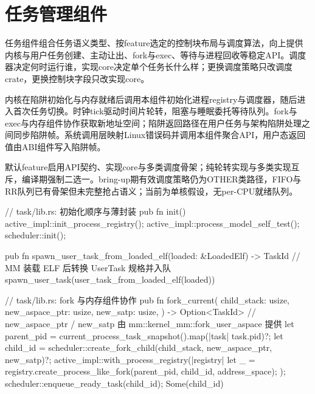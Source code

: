 
\section{任务管理组件}

任务组件组合任务语义类型、按feature选定的控制块布局与调度算法，向上提供内核与用户任务创建、主动让出、fork与exec、等待与进程回收等稳定API。调度器决定何时运行谁，实现core决定单个任务长什么样；更换调度策略只改调度crate，更换控制块字段只改实现core。

内核在陷阱初始化与内存就绪后调用本组件初始化进程registry与调度器，随后进入首次任务切换。时钟tick驱动时间片轮转，阻塞与睡眠委托等待队列。fork与exec与内存组件协作获取新地址空间；陷阱返回路径在用户任务与架构陷阱处理之间同步陷阱帧。系统调用层映射Linux错误码并调用本组件聚合API，用户态返回值由ABI组件写入陷阱帧。

默认feature启用API契约、实现core与多类调度骨架；纯轮转实现与多类实现互斥，编译期强制二选一。bring-up期有效调度策略仍为OTHER类路径，FIFO与RR队列已有骨架但未完整抢占语义；当前为单核假设，无per-CPU就绪队列。

\begin{rustcode}
// task/lib.rs: 初始化顺序与薄封装
pub fn init() {
    active_impl::init_process_registry();
    active_impl::process_model_self_test();
    scheduler::init();
}

pub fn spawn_user_task_from_loaded_elf(loaded: &LoadedElf) -> TaskId {
    // MM 装载 ELF 后转换 UserTask 规格并入队
    spawn_user_task(user_task_from_loaded_elf(loaded))
}
\end{rustcode}

\begin{rustcode}
// task/lib.rs: fork 与内存组件协作
pub fn fork_current(
    child_stack: usize,
    new_aspace_ptr: usize,
    new_satp: usize,
) -> Option<TaskId> {
    // new_aspace_ptr / new_satp 由 mm::kernel_mm::fork_user_aspace 提供
    let parent_pid = current_process_task_snapshot().map(|task| task.pid)?;
    let child_id = scheduler::create_fork_child(child_stack, new_aspace_ptr, new_satp)?;
    active_impl::with_process_registry(|registry| {
        let _ = registry.create_process_like_fork(parent_pid, child_id, address_space);
    });
    scheduler::enqueue_ready_task(child_id);
    Some(child_id)
}
\end{rustcode}
